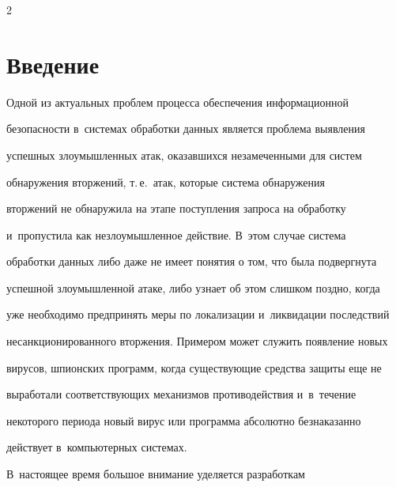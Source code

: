 




\thispagestyle{headings}





\begin{multicols}{2}





\label{st\stat}





  \section{Введение}


  


  Одной из актуальных проблем процесса обеспечения информационной 


безопасности в~системах обработки данных является проблема выявления 


успешных злоумышленных атак, оказавшихся незамеченными для систем 


обнаружения вторжений, т.\,е.\ атак, которые система обнаружения 


вторжений не обнаружила на этапе поступления запроса на обработку 


и~пропустила как незлоумышленное действие. В~этом случае система 


обработки данных либо даже не имеет понятия о том, что была подвергнута 


успешной злоумышленной атаке, либо узнает об этом слишком поздно, когда 


уже необходимо предпринять меры по локализации и~ликвидации последствий 


несанкционированного вторжения. Примером может служить появление новых 


вирусов, шпионских программ, когда су\-щест\-ву\-ющие средства защиты еще не 


выработали соответствующих механизмов противодействия и~в~течение 


некоторого периода новый вирус или программа абсолютно безнаказанно 


действует в~компьютерных системах. 


  


  В~настоящее время большое внимание уделяется разработкам 



\end{multicols}
